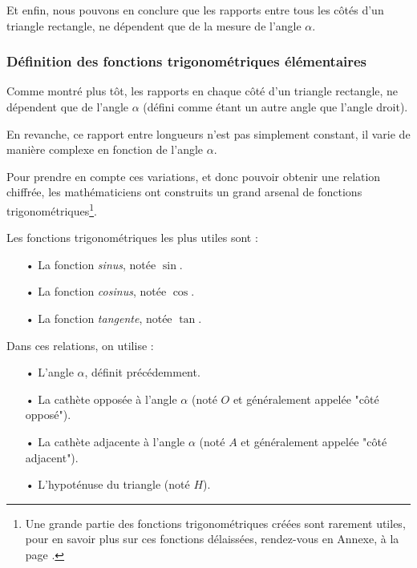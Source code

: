 \documentclass[a4paper]{article}
\begin{document}
			\medbreak

			Et enfin, 
			nous pouvons en conclure que les rapports entre tous les côtés d'un triangle rectangle,
			ne dépendent que de la mesure de l'angle $\alpha$.

			\bigbreak
			\bigbreak

		\subsubsection{Définition des fonctions trigonométriques élémentaires}

			Comme montré plus tôt, les rapports en chaque côté d'un triangle rectangle, 
			ne dépendent que de l'angle $\alpha$ (défini comme étant un autre angle que l'angle droit).
			
			En revanche, ce rapport entre longueurs n'est pas simplement constant, 
			il varie de manière complexe en fonction de l'angle $\alpha$.
			
			\medbreak

			Pour prendre en compte ces variations, et donc pouvoir obtenir une relation chiffrée, 
			les mathématiciens ont construits un grand arsenal de fonctions trigonométriques\footnote{
				Une grande partie des fonctions trigonométriques créées sont rarement utiles, 
				pour en savoir plus sur ces fonctions délaissées, rendez-vous en Annexe, à la page \pageref{fonction_trigo_chelous}.
			}. 
			

			{\noindent Les fonctions trigonométriques les plus utiles sont : }
			
			\begin{itemize}
				\item [•] La fonction \emph{sinus}, notée $\sin$.
				\item [•] La fonction \emph{cosinus}, notée $\cos$.
				\item [•] La fonction \emph{tangente}, notée $\tan$.
			\end{itemize}

			\bigskip

			{\noindent Dans ces relations, on utilise : }
			
			\begin{itemize}
				\item [•] L'angle $\alpha$, définit précédemment.
				\item [•] La cathète opposée à l'angle $\alpha$ (noté $O$ et généralement appelée "côté opposé").
				\item [•] La cathète adjacente à l'angle $\alpha$ (noté $A$ et généralement appelée "côté adjacent").
				\item [•] L'hypoténuse du triangle (noté $H$).
			\end{itemize}
\end{document}
